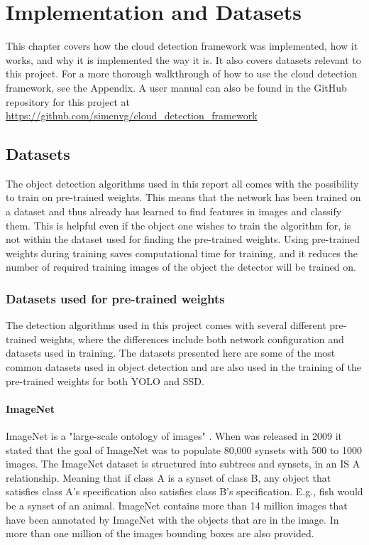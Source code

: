 
\chapter{Implementation and Datasets}

This chapter covers how the cloud detection framework was implemented, how it works, and why it is implemented the way it is. It also covers datasets relevant to this project. For a more thorough walkthrough of how to use the cloud detection framework, see the Appendix. A user manual can also be found in the GitHub repository for this project at \url{https://github.com/simenvg/cloud_detection_framework}

\section{Datasets}
The object detection algorithms used in this report all comes with the possibility to train on pre-trained weights. This means that the network has been trained on a dataset and thus already has learned to find features in images and classify them. This is helpful even if the object one wishes to train the algorithm for, is not within the dataset used for finding the pre-trained weights. Using pre-trained weights during training saves computational time for training, and it reduces the number of required training images of the object the detector will be trained on.

\vspace{3mm}

\subsection{Datasets used for pre-trained weights}
The detection algorithms used in this project comes with several different pre-trained weights, where the differences include both network configuration and datasets used in training. The datasets presented here are some of the most common datasets used in object detection and are also used in the training of the pre-trained weights for both YOLO and SSD.


\subsubsection{ImageNet}
ImageNet is a "large-scale ontology of images" \citep{Deng2009}. When \citep{Deng2009} was released in 2009 it stated that the goal of ImageNet was to populate 80,000 synsets with 500 to 1000 images. The ImageNet dataset is structured into subtrees and synsets, in an IS A relationship. Meaning that if class A is a synset of class B, any object that satisfies class A's specification also satisfies class B's specification. E.g., fish would be a synset of an animal. ImageNet contains more than 14 million images that have been annotated by ImageNet with the objects that are in the image. In more than one million of the images bounding boxes are also provided. 


